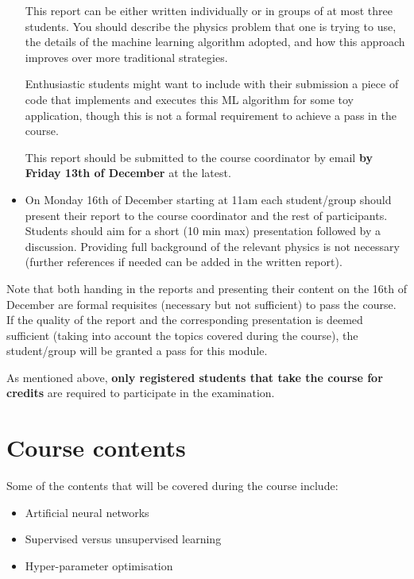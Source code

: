 \documentclass[12pt]{article}
\numberwithin{equation}{section}
\begin{document}
\begin{spacing}{1.1}
\begin{itemize}
  
  This report can be either written individually or in groups of at most three students.
  You should describe the physics problem that one is trying to use,
  the details of the machine learning algorithm adopted, and how
  this approach improves over more traditional strategies.

  Enthusiastic students might want to include with their submission
a piece of code that implements and executes this ML algorithm for some
toy application, though this is not a formal
requirement to achieve a pass in the course.

This report should be submitted to the course coordinator by email {\bf by Friday 13th of
December} at the latest.

\item On Monday 16th of December starting at 11am
  each student/group should present their report to the course coordinator
  and the rest of participants.
  Students should aim for a short (10 min max) presentation followed
  by a discussion.
  Providing full background of the relevant physics is not necessary
  (further references if needed can be added in the written report).

\end{itemize}  
  
Note that both handing in the reports and presenting their content
on the 16th of December
are formal requisites (necessary but not sufficient) to pass the course.
%
If the quality of the report and the corresponding presentation is deemed
sufficient (taking into account the topics covered during the course),
the student/group will be granted a pass for this module.

As mentioned above, {\bf only registered students that take
  the course for credits} are required to participate
in the examination.


\section{Course contents}

Some of the contents that will be covered during the course include:

\begin{itemize}

\item Artificial neural networks

\item Supervised versus unsupervised learning

\item Hyper-parameter optimisation


\end{itemize}
\end{spacing}
\end{document}
